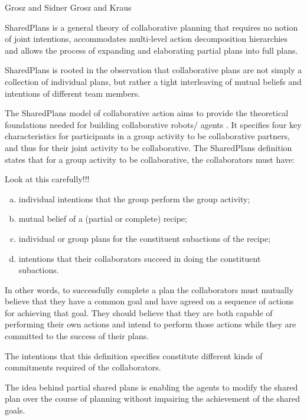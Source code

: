 \documentclass[11pt]{article}
\begin{document}
Grosz and Sidner \cite{grosz:plans-discourse}
Grosz and Kraus \cite{grosz:collaboration}

SharedPlans is a general theory of collaborative planning that requires no
notion of joint intentions, accommodates multi-level action decomposition
hierarchies and allows the process of expanding and elaborating partial plans
into full plans.

SharedPlans is rooted in the observation that collaborative plans are not simply
a collection of individual plans, but rather a tight interleaving of mutual
beliefs and intentions of different team members.

The SharedPlans model of collaborative action \cite{grosz:planning-acting}
\cite{grosz:collaboration} \cite{grosz:plans-discourse} aims to provide the
theoretical foundations needed for building collaborative robots/ agents
\cite{grosz:collaborative-systems}. It specifies four key characteristics for
participants in a group activity to be collaborative partners, and thus for
their joint activity to be collaborative. The SharedPlans definition states that
for a group activity to be collaborative, the collaborators must have:

Look at this carefully!!!

\begin{enumerate}[a)]
  \item individual intentions that the group perform the group activity;
  \item mutual belief of a (partial or complete) recipe;
  \item individual or group plans for the constituent subactions of the recipe;
  \item intentions that their collaborators succeed in doing the constituent
  subactions.
\end{enumerate}
 
In other words, to successfully complete a plan the collaborators must mutually
believe that they have a common goal and have agreed on a sequence of actions
for achieving that goal. They should believe that they are both capable of
performing their own actions and intend to perform those actions while they are
committed to the success of their plans.

The intentions that this definition specifies constitute different kinds of
commitments required of the collaborators. 

The idea behind partial shared plans is enabling the agents to modify the shared
plan over the course of planning without impairing the achievement of the shared
goals.
\end{document}
